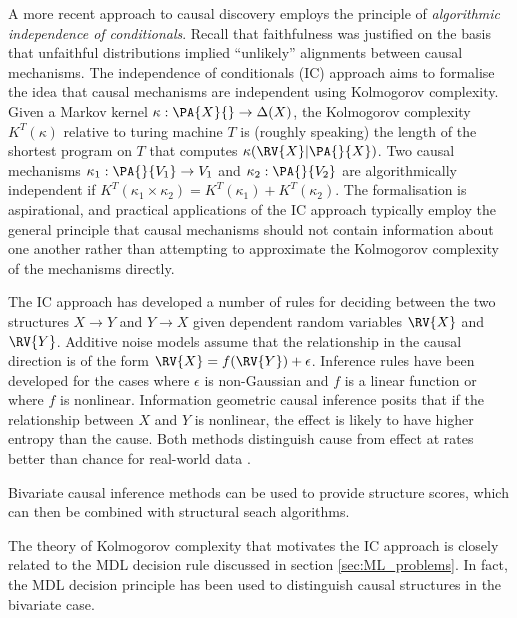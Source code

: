 
A more recent approach to causal discovery employs the principle of \emph{algorithmic independence of conditionals}. Recall that faithfulness was justified on the basis that unfaithful distributions implied ``unlikely'' alignments between causal mechanisms. The independence of conditionals (IC) approach aims to formalise the idea that causal mechanisms are independent using Kolmogorov complexity. Given a Markov kernel $\kappa:\PA{X}{}\to \Delta(X)$, the Kolmogorov complexity $K^T(\kappa)$ relative to turing machine $T$ is (roughly speaking) the length of the shortest program on $T$ that computes $\kappa(\RV{X}|\PA{}{X})$\cite{kolmogorov_three_1968,lemeire_replacing_2013}. Two causal mechanisms $\kappa_1:\PA{}{V_1}\to V_1$ and $\kappa_2:\PA{}{V_2}$ are algorithmically independent if $K^T(\kappa_1\times\kappa_2)=K^T(\kappa_1)+K^T(\kappa_2)$. The formalisation is aspirational, and practical applications of the IC approach typically employ the general principle that causal mechanisms should not contain information about one another rather than attempting to approximate the Kolmogorov complexity of the mechanisms directly\cite{lemeire_replacing_2013}. 

The IC approach has developed a number of rules for deciding between the two structures $X\to Y$ and $Y\to X$ given dependent random variables $\RV{X}$ and $\RV{Y}$. Additive noise models assume that the relationship in the causal direction is of the form $\RV{X}=f(\RV{Y})+\epsilon$. Inference rules have been developed for the cases where $\epsilon$ is non-Gaussian and $f$ is a linear function or where $f$ is nonlinear\cite{kano_causal_2003,hoyer_estimation_2008,hoyer_nonlinear_2009}. Information geometric causal inference posits that if the relationship between $X$ and $Y$ is nonlinear, the effect is likely to have higher entropy than the cause. Both methods distinguish cause from effect at rates better than chance for real-world data \cite{mooij_j.m._distinguishing_2016}.

Bivariate causal inference methods can be used to provide structure scores, which can then be combined with structural seach algorithms\cite{press_elements_nodate}.

The theory of Kolmogorov complexity that motivates the IC approach is closely related to the MDL decision rule discussed in section \ref{sec:ML_problems}. In fact, the MDL decision principle has been used to distinguish causal structures in the bivariate case\cite{budhathoki_causal_2016}.

